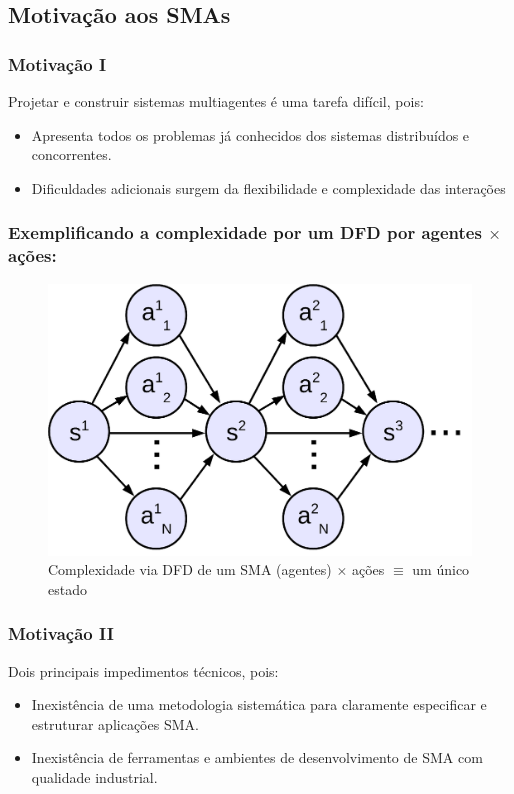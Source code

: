 \subsection{Motivação aos SMAs}
\begin{frame} %

\frametitle{Motivação I}
    Projetar e construir sistemas multiagentes é uma tarefa difícil, pois:
 \begin{itemize}
   \pause
   \item Apresenta todos os problemas já conhecidos 
dos sistemas distribuídos e concorrentes.
   \pause
   \item Dificuldades adicionais surgem da flexibilidade 
e complexidade das interações
    \end{itemize}
\end{frame}


\begin{frame}
\frametitle{Exemplificando a complexidade por um DFD por \textbf{agentes} $\times$ \textbf{ações}:}
  
  \begin{figure}[!ht]
  \centering
  \includegraphics[height =.6\textheight,width=.7\textwidth]{figuras/mudando_estados01.png}
  \caption{Complexidade via DFD de um SMA (agentes) $\times $ ações $\equiv $ um único estado}
\end{figure}
   
\end{frame}

\begin{frame}

    \frametitle{Motivação II}
   Dois principais impedimentos técnicos, pois:
  \begin{itemize}
  \pause
  \item Inexistência de uma metodologia sistemática para 
      claramente especificar e estruturar aplicações SMA.
  \pause
  \item Inexistência de ferramentas e ambientes de 
desenvolvimento de SMA com qualidade industrial.
    
  \end{itemize}

\end{frame}

